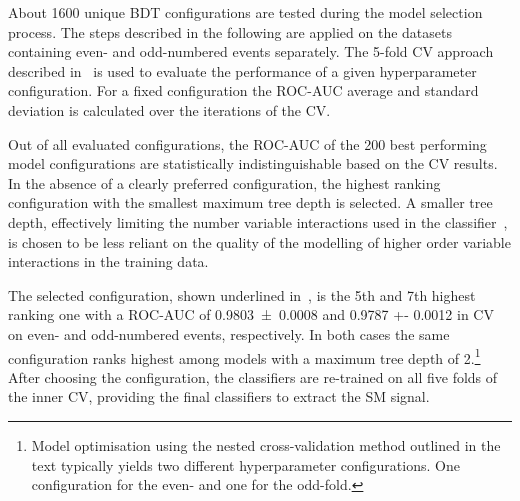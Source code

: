 About 1600 unique BDT configurations are tested during the model
selection process. The steps described in the following are applied on
the datasets containing even- and odd-numbered events separately. The
5-fold CV approach described in~ is used
to evaluate the performance of a given hyperparameter
configuration. For a fixed configuration the ROC-AUC average and
standard deviation is calculated over the iterations of the CV.

Out of all evaluated configurations, the ROC-AUC of the 200 best
performing model configurations are statistically indistinguishable
based on the CV results. In the absence of a clearly preferred
configuration, the highest ranking configuration with the smallest
maximum tree depth is selected. A smaller tree depth, effectively
limiting the number variable interactions used in the
classifier~\cite{hastie09}, is chosen to be less reliant on the
quality of the modelling of higher order variable interactions in the
training data.

The selected configuration, shown underlined
in~, is the 5th and 7th highest
ranking one with a ROC-AUC of \num{0.9803 +- 0.0008} and \num{0.9787
  +- 0.0012} in CV on even- and odd-numbered events, respectively. In
both cases the same configuration ranks highest among models with a
maximum tree depth of 2.\footnote{Model optimisation using the nested
  cross-validation method outlined in the text typically yields two
  different hyperparameter configurations. One configuration for the
  even- and one for the odd-fold.} After choosing the configuration,
the classifiers are re-trained on all five folds of the inner CV,
providing the final classifiers to extract the SM \HH signal.




